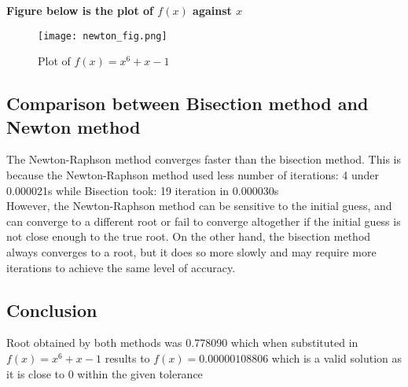 \documentclass{article}
\begin{document}
\textbf{Figure below is the plot of $f(x)$ against $x$ }
\begin{figure}[ht]
\centering
\texttt{[image: newton\_fig.png]}
\caption{Plot of $f(x) = x^6 + x - 1$}
\label{fig:myplot}
\end{figure}


\subsection{Comparison between Bisection method and Newton method}
The Newton-Raphson method converges faster than the bisection method. This is because the Newton-Raphson method used less number of iterations: 4 under 0.000021s while Bisection took: 19 iteration in 0.000030s\\[12pt]
However, the Newton-Raphson method can be sensitive to the initial guess, and can converge to a different root or fail to converge altogether if the initial guess is not close enough to the true root. On the other hand, the bisection method always converges to a root, but it does so more slowly and may require more iterations to achieve the same level of accuracy.

\subsection{Conclusion}
Root obtained by both methods was 0.778090 which when substituted in 
$f(x) = x^6 + x - 1$ results to $f(x) = 0.00000108806$ which is a valid solution as it is close to 0 within the given tolerance
\end{document}
